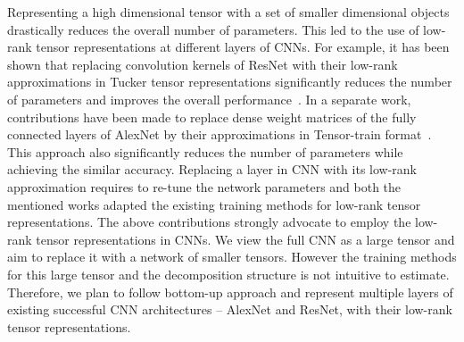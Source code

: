 \documentclass[11pt]{article}
\begin{document}
Representing a high dimensional tensor with a set of smaller dimensional objects drastically reduces the overall number of parameters. This led to the use of low-rank tensor representations at different layers of CNNs. For example, it has been shown that replacing convolution kernels of ResNet with their low-rank approximations in Tucker tensor representations significantly reduces the number of parameters and improves the overall performance~\cite{PSSEG+-ECCV2020}. In a separate work, contributions have been made to replace dense weight matrices of the fully connected layers of AlexNet by their approximations in Tensor-train format~\cite{NPOV-NIPS2015}. This approach also significantly reduces the number of parameters while achieving the similar accuracy. Replacing a layer in CNN with its low-rank approximation requires to re-tune the network parameters and both the mentioned works adapted the existing training methods for low-rank tensor representations. The above contributions strongly advocate to employ the low-rank tensor representations in CNNs. We view the full CNN as a large tensor and aim to replace it with a network of smaller tensors. However the training methods for this large tensor and the decomposition structure is not intuitive to estimate. Therefore, we plan to follow bottom-up approach and represent multiple layers of existing successful CNN architectures -- AlexNet and ResNet, with their low-rank tensor representations.
\end{document}
